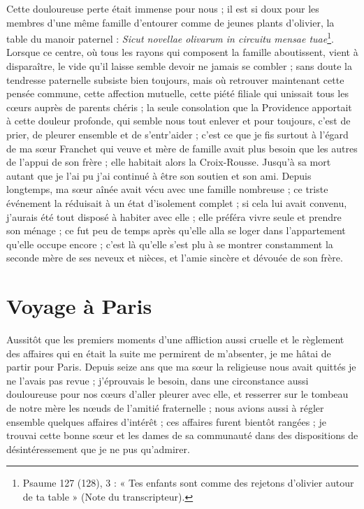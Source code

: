\documentclass[11pt,a4paper]{report}
\begin{document}
Cette douloureuse perte était immense pour nous ; il est si doux pour les membres d'une même famille d'entourer comme de jeunes plants d'olivier, la table du manoir paternel : \textit{Sicut novellae olivarum in circuitu mensae tuae}\footnote{Psaume 127 (128), 3 : « Tes enfants sont comme des rejetons d'olivier autour de ta table » (Note du transcripteur).}. Lorsque ce centre, où tous les rayons qui composent la famille aboutissent, vient à disparaître, le vide qu'il laisse semble devoir ne jamais se combler ; sans doute la tendresse paternelle subsiste bien toujours, mais où retrouver maintenant cette pensée commune, cette affection mutuelle, cette piété filiale qui unissait tous les cœurs auprès de parents chéris ; la seule consolation que la Providence apportait à cette douleur profonde, qui semble nous tout enlever et pour toujours, c'est de prier, de pleurer ensemble et de s'entr'aider ; c'est ce que je fis surtout à l'égard de ma sœur Franchet qui veuve et mère de famille avait plus besoin que les autres de l'appui de son frère ; elle habitait alors la Croix-Rousse. Jusqu'à sa mort autant que je l'ai pu j'ai continué à être son soutien et son ami. Depuis longtemps, ma sœur aînée avait vécu avec une famille nombreuse ; ce triste événement la réduisait à un état d'isolement complet ; si cela lui avait convenu, j'aurais été tout disposé à habiter avec elle ; elle préféra vivre seule et prendre son ménage ; ce fut peu de temps après qu'elle alla se loger dans l'appartement qu'elle occupe encore ; c'est là qu'elle s'est plu à se montrer constamment la seconde mère de ses neveux et nièces, et l'amie sincère et dévouée de son frère.

\section*{Voyage à Paris}

Aussitôt que les premiers moments d'une affliction aussi cruelle et le règlement des affaires qui en était la suite me permirent de m'absenter, je me hâtai de partir pour Paris. Depuis seize ans que ma sœur la religieuse nous avait quittés je ne l'avais pas revue ; j'éprouvais le besoin, dans une circonstance aussi douloureuse pour nos cœurs d'aller pleurer avec elle, et resserrer sur le tombeau de notre mère les nœuds de l'amitié fraternelle ; nous avions aussi à régler ensemble quelques affaires d'intérêt ; ces affaires furent bientôt rangées ; je trouvai cette bonne sœur et les dames de sa communauté dans des dispositions de désintéressement que je ne pus qu'admirer.
\end{document}
